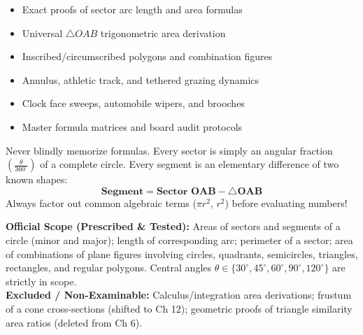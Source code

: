 \documentclass[10pt,a4paper]{article}
\begin{document}
\vspace{3mm}
\begin{minipage}[t]{0.48\textwidth}
  \begin{conceptBox}[title=What This Handbook Includes,fonttitle=\bfseries\color{navy}]
    \begin{itemize}
      \item Exact proofs of sector arc length and area formulas
      \item Universal $\triangle OAB$ trigonometric area derivation
      \item Inscribed/circumscribed polygons and combination figures
      \item Annulus, athletic track, and tethered grazing dynamics
      \item Clock face sweeps, automobile wipers, and brooches
      \item Master formula matrices and board audit protocols
    \end{itemize}
  \end{conceptBox}
\end{minipage}\hfill
\begin{minipage}[t]{0.48\textwidth}
  \begin{formulaBox}[title=Pedagogical Strategy: Foundations First,fonttitle=\bfseries\color{navy}]
    \raggedright Never blindly memorize formulas. Every sector is simply an angular fraction $\left(\frac{\theta}{360^\circ}\right)$ of a complete circle. Every segment is an elementary difference of two known shapes:
    $$\mathbf{\text{Segment} = \text{Sector } OAB - \triangle OAB}$$
    Always factor out common algebraic terms ($\pi r^2$, $r^2$) before evaluating numbers!
  \end{formulaBox}
\end{minipage}

\vspace{1.5mm}
\begin{warningBox}[title=CBSE 2026--27 Curriculum Verification \& Rationalized Scope,fonttitle=\bfseries\color{navy}]
  \textbf{Official Scope (Prescribed \& Tested):} Areas of sectors and segments of a circle (minor and major); length of corresponding arc; perimeter of a sector; area of combinations of plane figures involving circles, quadrants, semicircles, triangles, rectangles, and regular polygons. Central angles $\theta \in \{30^\circ, 45^\circ, 60^\circ, 90^\circ, 120^\circ\}$ are strictly in scope.\\
  \textbf{Excluded / Non-Examinable:} Calculus/integration area derivations; frustum of a cone cross-sections (shifted to Ch 12); geometric proofs of triangle similarity area ratios (deleted from Ch 6).
\end{warningBox}
\end{document}
